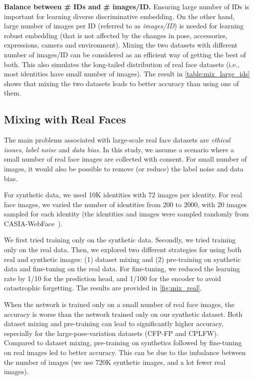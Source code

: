 \documentclass[10pt,twocolumn,letterpaper]{article}
\begin{document}
\noindent
\textbf{Balance between \# IDs and \# images/ID.} 
Ensuring large number of IDs is important for learning diverse discriminative embedding. 
On the other hand, large number of images per ID (referred to as \textit{images/ID}) is needed for learning robust embedding (that is not affected by the changes in pose, accessories, expressions, camera and environment).
Mixing the two datasets with different number of images/ID can be considered as an efficient way of getting the best of both. 
This also simulates the long-tailed distribution of real face datasets (i.e., most identities have small number of images). 
The result in \autoref{table:mix_large_ids} shows that mixing the two datasets leads to better accuracy than using one of them. 



\subsection{Mixing with Real Faces}
\label{sec:exp3}

The main problems associated with large-scale real face datasets are \textit{ethical issues}, \textit{label noise} and \textit{data bias}. 
In this study, we assume a scenario where a small number of real face images are collected with consent. 
For small number of images, it would also be possible to remove (or reduce) the label noise and data bias.

For synthetic data, we used 10K identities with 72 images per identity. For real face images, we varied the number of identities from 200 to 2000, with 20 images sampled for each identity (the identities and images were sampled randomly from CASIA-WebFace~\cite{2014_FRD_casiawebface}).

We first tried training only on the synthetic data. Secondly, we tried training only on the real data. Then, we explored two different strategies for using both real and synthetic images: (1) dataset mixing and (2) pre-training on synthetic data and fine-tuning on the real data. For fine-tuning, we reduced the learning rate by 1/10 for the prediction head, and 1/100 for the encoder to avoid catastrophic forgetting. The results are provided in \autoref{fig:mix_real}.

When the network is trained only on a small number of real face images, the accuracy is worse than the network trained only on our synthetic dataset.
Both dataset mixing and pre-training can lead to significantly higher accuracy, especially for the large-pose-variation datasets (CFP-FP and CPLFW). 
Compared to dataset mixing, pre-training on synthetics followed by fine-tuning on real images led to better accuracy.
This can be due to the imbalance between the number of images (we use 720K synthetic images, and a lot fewer real images). 
\end{document}
